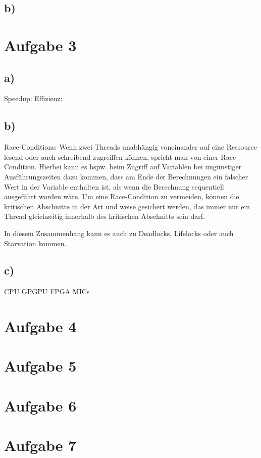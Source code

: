 \documentclass{article}
\begin{document}
	\subsection{b)}

    \section{Aufgabe 3}
        \subsection{a)}
        Speedup:
        Effizienz:
        \subsection{b)}
        Race-Conditions: Wenn zwei Threads unabhängig voneinander auf eine Ressource lesend oder auch schreibend zugreiffen können, 
        spricht man von einer Race-Condition. Hierbei kann es bspw. beim Zugriff auf Variablen bei ungünstiger Ausführungszeiten
        dazu kommen, dass am Ende der Berechnungen ein falscher Wert in der Variable enthalten ist, als wenn die Berechnung sequentiell 
        ausgeführt worden wäre.
        Um eine Race-Condition zu vermeiden, können die kritischen Abschnitte in der Art und weise gesichert werden, das immer nur ein 
        Thread gleichzeitig innerhalb des kritischen Abschnitts sein darf.

        In diesem Zusammenhang kann es auch zu Deadlocks, Lifelocks oder auch Starvation kommen. 
        \subsection{c)}
        CPU
        GPGPU
        FPGA
        MICs

    \section{Aufgabe 4}

    \section{Aufgabe 5}

\section{Aufgabe 6}

\section{Aufgabe 7}
\end{document}
